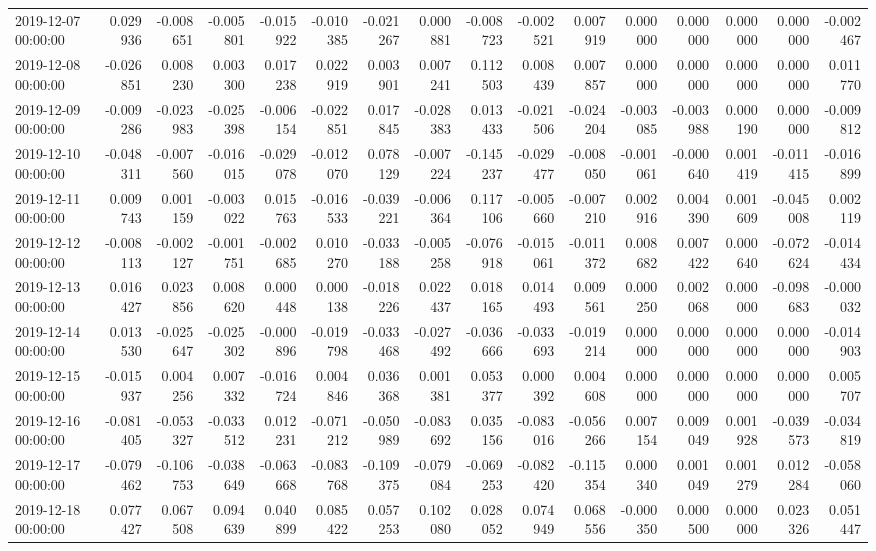 \begin{tabular}{lrrrrrrrrrrrrrrr}
2019-12-07 00:00:00 & 0.029936 & -0.008651 & -0.005801 & -0.015922 & -0.010385 & -0.021267 & 0.000881 & -0.008723 & -0.002521 & 0.007919 & 0.000000 & 0.000000 & 0.000000 & 0.000000 & -0.002467 \\
2019-12-08 00:00:00 & -0.026851 & 0.008230 & 0.003300 & 0.017238 & 0.022919 & 0.003901 & 0.007241 & 0.112503 & 0.008439 & 0.007857 & 0.000000 & 0.000000 & 0.000000 & 0.000000 & 0.011770 \\
2019-12-09 00:00:00 & -0.009286 & -0.023983 & -0.025398 & -0.006154 & -0.022851 & 0.017845 & -0.028383 & 0.013433 & -0.021506 & -0.024204 & -0.003085 & -0.003988 & 0.000190 & 0.000000 & -0.009812 \\
2019-12-10 00:00:00 & -0.048311 & -0.007560 & -0.016015 & -0.029078 & -0.012070 & 0.078129 & -0.007224 & -0.145237 & -0.029477 & -0.008050 & -0.001061 & -0.000640 & 0.001419 & -0.011415 & -0.016899 \\
2019-12-11 00:00:00 & 0.009743 & 0.001159 & -0.003022 & 0.015763 & -0.016533 & -0.039221 & -0.006364 & 0.117106 & -0.005660 & -0.007210 & 0.002916 & 0.004390 & 0.001609 & -0.045008 & 0.002119 \\
2019-12-12 00:00:00 & -0.008113 & -0.002127 & -0.001751 & -0.002685 & 0.010270 & -0.033188 & -0.005258 & -0.076918 & -0.015061 & -0.011372 & 0.008682 & 0.007422 & 0.000640 & -0.072624 & -0.014434 \\
2019-12-13 00:00:00 & 0.016427 & 0.023856 & 0.008620 & 0.000448 & 0.000138 & -0.018226 & 0.022437 & 0.018165 & 0.014493 & 0.009561 & 0.000250 & 0.002068 & 0.000000 & -0.098683 & -0.000032 \\
2019-12-14 00:00:00 & 0.013530 & -0.025647 & -0.025302 & -0.000896 & -0.019798 & -0.033468 & -0.027492 & -0.036666 & -0.033693 & -0.019214 & 0.000000 & 0.000000 & 0.000000 & 0.000000 & -0.014903 \\
2019-12-15 00:00:00 & -0.015937 & 0.004256 & 0.007332 & -0.016724 & 0.004846 & 0.036368 & 0.001381 & 0.053377 & 0.000392 & 0.004608 & 0.000000 & 0.000000 & 0.000000 & 0.000000 & 0.005707 \\
2019-12-16 00:00:00 & -0.081405 & -0.053327 & -0.033512 & 0.012231 & -0.071212 & -0.050989 & -0.083692 & 0.035156 & -0.083016 & -0.056266 & 0.007154 & 0.009049 & 0.001928 & -0.039573 & -0.034819 \\
2019-12-17 00:00:00 & -0.079462 & -0.106753 & -0.038649 & -0.063668 & -0.083768 & -0.109375 & -0.079084 & -0.069253 & -0.082420 & -0.115354 & 0.000340 & 0.001049 & 0.001279 & 0.012284 & -0.058060 \\
2019-12-18 00:00:00 & 0.077427 & 0.067508 & 0.094639 & 0.040899 & 0.085422 & 0.057253 & 0.102080 & 0.028052 & 0.074949 & 0.068556 & -0.000350 & 0.000500 & 0.000000 & 0.023326 & 0.051447 \\

\end{tabular}
